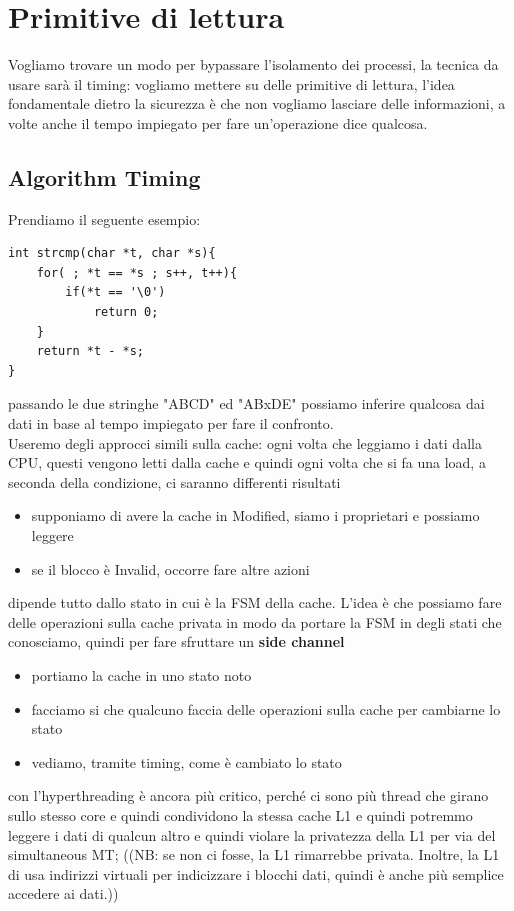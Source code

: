 \documentclass[12pt, oneside]{extbook} %
\begin{document}
\section{Primitive di lettura}
Vogliamo trovare un modo per bypassare l'isolamento dei processi, la tecnica da usare sarà il timing: vogliamo mettere su delle primitive di lettura, l'idea fondamentale dietro la sicurezza è che non vogliamo lasciare delle informazioni, a volte anche il tempo impiegato per fare un'operazione dice qualcosa. 
\subsection{Algorithm Timing}
Prendiamo il seguente esempio:
\begin{lstlisting}
int strcmp(char *t, char *s){
	for( ; *t == *s ; s++, t++){
		if(*t == '\0')
			return 0;	
	}
	return *t - *s;
}
\end{lstlisting}
passando le due stringhe "ABCD" ed "ABxDE" possiamo inferire qualcosa dai dati in base al tempo impiegato per fare il confronto.\\ Useremo degli approcci simili sulla cache: ogni volta che leggiamo i dati dalla CPU, questi vengono letti dalla cache e quindi ogni volta che si fa una load, a seconda della condizione, ci saranno differenti risultati
\begin{itemize}
\item supponiamo di avere la cache in Modified, siamo i proprietari e possiamo leggere
\item se il blocco è Invalid, occorre fare altre azioni
\end{itemize}
dipende tutto dallo stato in cui è la FSM della cache. L'idea è che possiamo fare delle operazioni sulla cache privata in modo da portare la FSM in degli stati che conosciamo, quindi per fare sfruttare un \textbf{side channel}
\begin{itemize}
\item portiamo la cache in uno stato noto
\item facciamo si che qualcuno faccia delle operazioni sulla cache per cambiarne lo stato
\item vediamo, tramite timing, come è cambiato lo stato
\end{itemize}
con l'hyperthreading è ancora più critico, perché ci sono più thread che girano sullo stesso core e quindi condividono la stessa cache L1 e quindi potremmo leggere i dati di qualcun altro e quindi violare la privatezza della L1 per via del simultaneous MT; ((NB: se non ci fosse, la L1 rimarrebbe privata. Inoltre, la L1 di usa indirizzi virtuali per indicizzare i blocchi dati, quindi è anche più semplice accedere ai dati.))
\end{document}
